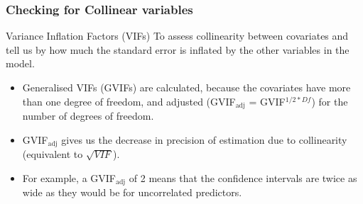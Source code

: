 \begin{frame}[fragile]
\frametitle{Checking for Collinear variables}
\begin{block}{Variance Inflation Factors (VIFs)}
To assess collinearity between covariates and tell us by how much the standard error is inflated by the other variables in the model.
\end{block}

\begin{itemize}
\item Generalised VIFs (GVIFs) are calculated, because the covariates have more than one degree of freedom, and adjusted (GVIF$_{\textrm{adj}}$ = GVIF$^{1/2*Df}$) for the number of degrees of freedom.
\item GVIF$_{\textrm{adj}}$ gives us the decrease in precision of estimation due to collinearity (equivalent to $\sqrt{VIF}$). 
\item For example, a GVIF$_{\textrm{adj}}$ of 2 means that the confidence intervals are twice as wide as they would be for uncorrelated predictors.
\end{itemize}
\end{frame}

